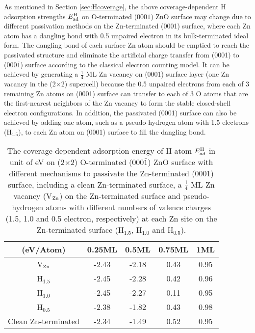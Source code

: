 
As mentioned in Section \ref{sec:Hcoverage}, the above coverage-dependent H adsorption strengths $E_{\textup{ad}}^{\textup{H}}$ on O-terminated (000$\overline{1}$) ZnO surface may change due to different passivation methods on the Zn-terminated (0001) surface, where each Zn atom has a dangling bond with 0.5 unpaired electron in its bulk-terminated ideal form. The dangling bond of each surface Zn atom should be emptied to reach the passivated structure and eliminate the artificial charge transfer from (0001) to (000$\overline{1}$) surface according to the classical electron counting model\cite{pashley1989electron}. It can be achieved by generating a  $\frac{1}{4}$ ML Zn vacancy on (0001) surface layer (one Zn vacancy in the (2$\times$2) supercell) because the 0.5 unpaired electrons from each of 3 remaining Zn atoms on (0001) surface can transfer to each of 3 O atoms that are the first-nearest neighbors of the Zn vacancy to form the stable closed-shell electron configurations. In addition, the passivated (0001) surface can also be achieved by adding one atom, such as a pseudo-hydrogen atom with 1.5 electrons (H$_{1.5}$), to each Zn atom on (0001) surface to fill the dangling bond.

\begin{table}[!htbp]
\centering
\caption[The coverage-dependent adsorption energy of H atom $E_{\textup{ad}}^{\textup{H}}$ in unit of eV on (2$\times$2) O-terminated (000$\bar{1}$) ZnO surface with different mechanisms to passivate the Zn-terminated (0001) surface, including a clean Zn-terminated surface, a $\frac{1}{4}$ ML Zn vacancy (V$_{\textup{Zn}}$) on the Zn-terminated surface and pseudo-hydrogen atoms with different numbers of valence charges (1.5, 1.0 and 0.5 electron, respectively) at each Zn site on the Zn-terminated surface (H$_{1.5}$, H$_{1.0}$ and H$_{0.5}$).]{The coverage-dependent adsorption energy of H atom $E_{\textup{ad}}^{\textup{H}}$ in unit of eV on (2$\times$2) O-terminated (000$\bar{1}$) ZnO surface with different mechanisms to passivate the Zn-terminated (0001) surface, including a clean Zn-terminated surface, a $\frac{1}{4}$ ML Zn vacancy (V$_{\textup{Zn}}$) on the Zn-terminated surface and pseudo-hydrogen atoms with different numbers of valence charges (1.5, 1.0 and 0.5 electron, respectively) at each Zn site on the Zn-terminated surface (H$_{1.5}$, H$_{1.0}$ and H$_{0.5}$).}
\label{tab:pass}
\begin{tabular}{ccccc}
\hline
\hline
(eV/Atom)       & 0.25ML & 0.5ML & 0.75ML & 1ML  \\ \hline
V$_{\textup{Zn}}$     & -2.43  & -2.18 & 0.43   & 0.95 \\
H$_{1.5}$         & -2.45  & -2.28 & 0.42   & 0.96 \\
H$_{1.0}$         & -2.45  & -2.27 & 0.11   & 0.95 \\
H$_{0.5}$         & -2.38  & -1.82 & 0.43   & 0.98 \\ 
Clean Zn-terminated & -2.34  & -1.49 & 0.52   & 0.95 \\
\hline
\hline
\end{tabular}
\end{table}

